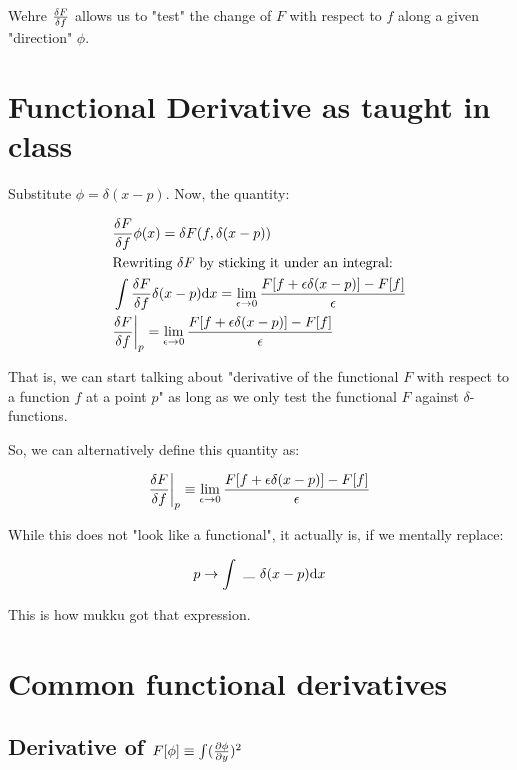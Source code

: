 Wehre $\fdv{F}{f}$ allows us to "test" the change of $F$ with respect to $f$
along a given "direction" $\phi$.

\section{Functional Derivative as taught in class}

Substitute $\phi = \delta (x - p)$. Now, the quantity:

\begin{align*}
    &\fdv{F}{f}(x) \phi(x) =
    \delta F (f, \delta (x - p))  \\
    &\text{Rewriting $\delta F$ by sticking it under an integral:} \\
    &\int \fdv{F}{f} (x) \delta (x - p) \dd x =  
    \lim_{\epsilon \to 0}
    \frac{F[f + \epsilon \delta (x - p)] - F[f]}{\epsilon}  \\
    & \fdv{F}{f}{\bigg \rvert_p} = 
    \lim_{\epsilon \to 0}
    \frac{F[f + \epsilon \delta (x - p)] - F[f]}{\epsilon}
\end{align*}

That is, we can start talking about "derivative of the functional $F$ with
respect to a function $f$ at a point $p$" as long as we only test the functional $F$ against
$\delta$-functions.

So, we can alternatively define this quantity as:

\begin{align*}
\fdv{F}{f}{\bigg \rvert_p} \equiv 
\lim_{\epsilon \to 0} \frac{F[f + \epsilon \delta (x - p)] - F[f]}{\epsilon}
\end{align*}

While this does not "look like a functional", it actually is, if we
mentally replace:

\begin{align*}
    p \to  \int ~\rule{0.3cm}{0.1mm}~\delta (x - p) \dd x
\end{align*}

This is how mukku got that expression.

\section{Common functional derivatives}

\subsection{Derivative of $F[\phi] \equiv \int (\pdv{\phi}{y})^2$}

